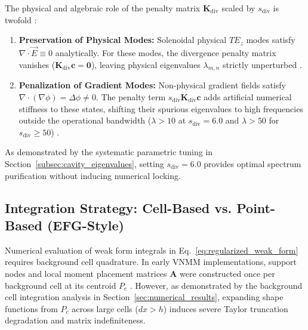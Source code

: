 \documentclass[preprint,12pt]{elsarticle}
\begin{document}
The physical and algebraic role of the penalty matrix $\mathbf{K}_{\mathrm{div}}$ scaled by $s_{\mathrm{div}}$ is twofold \cite{monk2003finite, bossavit1990spurious}:
\begin{enumerate}
    \item \textbf{Preservation of Physical Modes:} Solenoidal physical $TE_z$ modes satisfy $\nabla \cdot \vec{E} \equiv 0$ analytically. For these modes, the divergence penalty matrix vanishes ($\mathbf{K}_{\mathrm{div}} \mathbf{c} = \mathbf{0}$), leaving physical eigenvalues $\lambda_{m,n}$ strictly unperturbed \cite{monk2003finite, jin2014finite}.
    \item \textbf{Penalization of Gradient Modes:} Non-physical gradient fields satisfy $\nabla \cdot (\nabla \phi) = \Delta \phi \neq 0$. The penalty term $s_{\mathrm{div}} \mathbf{K}_{\mathrm{div}} \mathbf{c}$ adds artificial numerical stiffness to these states, shifting their spurious eigenvalues to high frequencies outside the operational bandwidth ($\lambda > 10$ at $s_{\mathrm{div}} = 6.0$ and $\lambda > 50$ for $s_{\mathrm{div}} \ge 50$) \cite{monk2003finite, bossavit1990spurious, boffi1999computational}.
\end{enumerate}
As demonstrated by the systematic parametric tuning in Section~\ref{subsec:cavity_eigenvalues}, setting $s_{\mathrm{div}} = 6.0$ provides optimal spectrum purification without inducing numerical locking.



\subsection{Integration Strategy: Cell-Based vs. Point-Based (EFG-Style)}
\label{subsec:integration_strategy}

Numerical evaluation of weak form integrals in Eq.~\eqref{eq:regularized_weak_form} requires background cell quadrature. In early VNMM implementations, support nodes and local moment placement matrices $\mathbf{A}$ were constructed once per background cell at its centroid $P_c$ \cite{ortiz2021nodal, ortiz2023tese}. However, as demonstrated by the background cell integration analysis in Section~\ref{sec:numerical_results}, expanding shape functions from $P_c$ across large cells ($dx > h$) induces severe Taylor truncation degradation and matrix indefiniteness.
\end{document}
